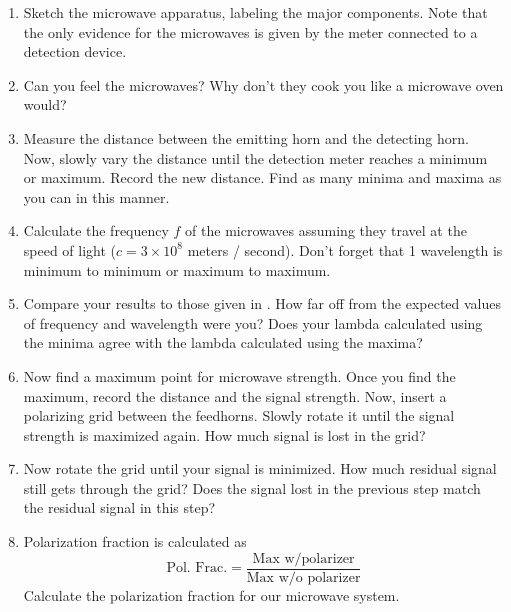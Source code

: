 \begin{enumerate}
	\item Sketch the microwave apparatus, labeling the major components.  Note that the only evidence for the microwaves is given by the meter connected to a detection device.
	\item Can you feel the microwaves?  Why don't they cook you like a microwave oven would?
	\item Measure the distance between the emitting horn and the detecting horn.  Now, slowly vary the distance until the detection meter reaches a minimum or maximum.  Record the new distance.  Find as many minima and maxima as you can in this manner.
	\item Calculate the frequency $f$ of the microwaves assuming they travel at the speed of light ($c=3\times10^{8}$ meters / second).  Don't forget that 1 wavelength is minimum to minimum or maximum to maximum.
	\item Compare your results to those given in . How far off from the expected values of frequency and wavelength were you?  Does your lambda calculated using the minima agree with the lambda calculated using the maxima?
	\item Now find a maximum point for microwave strength.  Once you find the maximum, record the distance and the signal strength.  Now, insert a polarizing grid between the feedhorns.  Slowly rotate it until the signal strength is maximized again.  How much signal is lost in the grid?  
	\item Now rotate the grid until your signal is minimized.  How much residual signal still gets through the grid?  Does the signal lost in the previous step match the residual signal in this step?  
	\item Polarization fraction is calculated as \[\textrm{Pol. Frac.}=\frac{\textrm{Max w/polarizer}}{\textrm{Max w/o polarizer}}\] Calculate the polarization fraction for our microwave system.
\end{enumerate}
	

